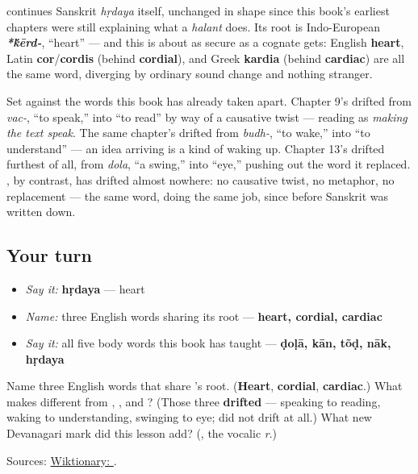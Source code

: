 \begin{cousinweb}
\textbf{} continues Sanskrit \textbf{} \emph{hṛdaya} itself, unchanged in shape since this book's earliest chapters were still explaining what a \emph{halant} does. Its root is Indo-European \emph{\textbf{*\'{k}ērd-}}, \textquotedblleft{}heart\textquotedblright{} — and this is about as secure as a cognate gets: English \textbf{heart}, Latin \textbf{cor}/\textbf{cordis} (behind \textbf{cordial}), and Greek \textbf{kardia} (behind \textbf{cardiac}) are all the same word, diverging by ordinary sound change and nothing stranger.
\end{cousinweb}

\begin{culture}
Set \textbf{} against the words this book has already taken apart. Chapter 9's \textbf{} drifted from \emph{vac-}, \textquotedblleft{}to speak,\textquotedblright{} into \textquotedblleft{}to read\textquotedblright{} by way of a causative twist — reading as \emph{making the text speak}. The same chapter's \textbf{} drifted from \emph{budh-}, \textquotedblleft{}to wake,\textquotedblright{} into \textquotedblleft{}to understand\textquotedblright{} — an idea arriving is a kind of waking up. Chapter 13's \textbf{} drifted furthest of all, from \emph{dola}, \textquotedblleft{}a swing,\textquotedblright{} into \textquotedblleft{}eye,\textquotedblright{} pushing out the word it replaced. \textbf{}, by contrast, has drifted almost nowhere: no causative twist, no metaphor, no replacement — the same word, doing the same job, since before Sanskrit was written down.
\end{culture}

\subsection*{Your turn}
\begin{itemize}
\raggedright
  \item \emph{Say it:} \textbf{hṛdaya} — heart
  \item \emph{Name:} three English words sharing its root — \textbf{heart, cordial, cardiac}
  \item \emph{Say it:} all five body words this book has taught — \textbf{ḍoḷā, kān, tõḍ, nāk, hṛdaya}
\end{itemize}

\begin{tcolorbox}[breakable,colback=teal!4,colframe=teal!35!black,title={Before you move on}]
Name three English words that share \textbf{}'s root. (\textbf{Heart}, \textbf{cordial}, \textbf{cardiac}.) What makes \textbf{} different from \textbf{}, \textbf{}, and \textbf{}? (Those three \textbf{drifted} — speaking to reading, waking to understanding, swinging to eye; \textbf{} did not drift at all.) What new Devanagari mark did this lesson add? (\textbf{}, the vocalic \emph{r}.)

Sources: \href{https://en.wiktionary.org/wiki/\%E0\%A4\%B9\%E0\%A5\%83\%E0\%A4\%A6\%E0\%A4\%AF}{Wiktionary: }.
\end{tcolorbox}
